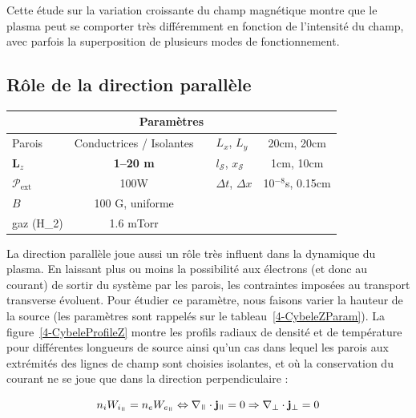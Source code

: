 \begin{refsection}
Cette étude sur la variation croissante du champ magnétique montre 
que le plasma peut se comporter très différemment en fonction de
l'intensité du champ, avec parfois la superposition de plusieurs modes de
fonctionnement.

\subsection{Rôle de la direction parallèle}
\begin{minipage}{\textwidth}
\footnotesize\centering
{}
\begin{tabular}{lcclc}\toprule
\multicolumn{5}{c}{\bf Paramètres}\\
\midrule 
Parois & Conductrices / Isolantes &&$L_x$, $L_y$  & 20cm, 20cm\\
\textbf{L}$_z$& \textbf{1--20 m}&&$l_\mathcal{S}$, $x_\mathcal{S}$&1cm, 10cm\\
$\mathcal{P}_\text{ext}$&100W&&$\Delta t$, $\Delta x$&10$^{-8}$s,
0.15cm\\
$B$ & 100 G, uniforme&&&\\
gaz (H_2) & 1.6 mTorr&&&\\
\bottomrule
\end{tabular}
\label{4-CybeleZParam}
\end{minipage}	

La direction parallèle joue aussi un rôle très influent dans la
dynamique du plasma. En laissant plus ou moins la possibilité aux électrons (et
donc au courant) de sortir du système par les parois, les contraintes imposées
au transport transverse évoluent. Pour étudier ce paramètre, nous faisons
varier la hauteur de la source (les paramètres sont rappelés sur le
tableau~\ref{4-CybeleZParam}). La figure~\ref{4-CybeleProfileZ} montre les
profils radiaux de densité et de température pour différentes longueurs de source ainsi qu'un cas dans lequel les parois aux extrémités des lignes de champ sont choisies isolantes, et où la conservation du courant ne se joue que dans la
direction perpendiculaire :

\begin{equation}
n_iW_{i_\para}=n_eW_{e_\para}\Leftrightarrow\nabla_\para\cdot\mathbf j_\para = 0
\Rightarrow \nabla_\perp\cdot\mathbf j_\perp = 0
\end{equation}


\end{refsection}
